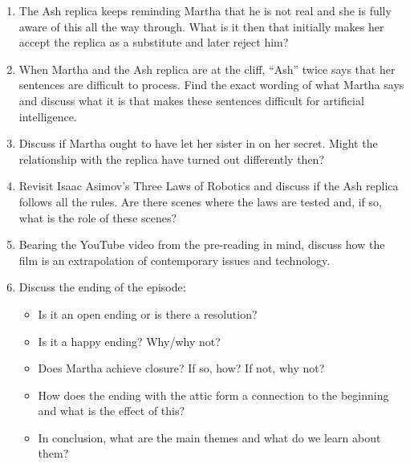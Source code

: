 \documentclass[10pt,a4paper,table]{article}
\newcommand{\qm}[1]{``#1''}
\begin{document}
\begin{enumerate}
  \item The Ash replica keeps reminding Martha that he is not real and she is fully aware of this all the way through. What is it then that initially makes her accept the replica as a substitute and later reject him?

  \item When Martha and the Ash replica are at the cliff, \qm{Ash} twice says that her sentences are difficult to process. Find the exact wording of what Martha says and discuss what it is that makes these sentences difficult for artificial intelligence.

  \item Discuss if Martha ought to have let her sister in on her secret. Might the relationship with the replica have turned out differently then?

  \item Revisit Isaac Asimov's Three Laws of Robotics and discuss if the Ash replica follows all the rules. Are there scenes where the laws are tested and, if so, what is the role of these scenes?

  \item Bearing the YouTube video from the pre-reading in mind, discuss how the film is an extrapolation of contemporary issues and technology.

  \item Discuss the ending of the episode:
    \begin{itemize}
      \item Is it an open ending or is there a resolution?
      \item Is it a happy ending? Why/why not?
      \item Does Martha achieve closure? If so, how? If not, why not?
      \item How does the ending with the attic form a connection to the beginning and what is the effect of this?
      \item In conclusion, what are the main themes and what do we learn about them?
    \end{itemize}
\end{enumerate}
\end{document}
